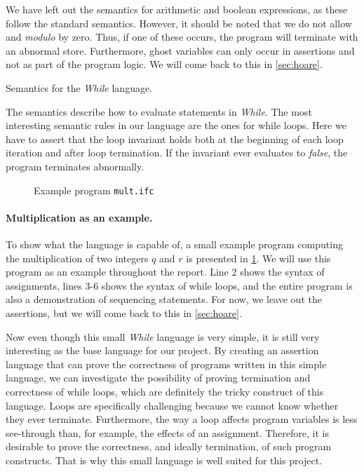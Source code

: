 We have left out the semantics for arithmetic and boolean expressions, as these follow the standard semantics.
However, it should be noted that we do not allow  and \textit{modulo} by zero.
Thus, if one of these occurs, the program will terminate with an abnormal store.
Furthermore, ghost variables can only occur in assertions and not as part of the program logic. We will come back to this in \cref{sec:hoare}.

\begin{table}[h!]
\centering

\caption{Semantics for the \textit{While} language.}
\label{table:semantic}
\end{table}

The semantics describe how to evaluate statements in \textit{While}. The most interesting semantic rules in our language are the ones for while loops.
Here we have to assert that the loop invariant holds both at the beginning of each loop iteration and after loop termination.
If the invariant ever evaluates to \textit{false}, the program terminates abnormally.

\begin{figure}[h]

\caption{Example program \texttt{mult.ifc}}
\label{figure:basicmult}
\end{figure}

\paragraph{Multiplication as an example.}
To show what the language is capable of, a small example program computing the multiplication of two integers $q$ and $r$ is presented in \cref{figure:basicmult}. 
We will use this program as an example throughout the report.
Line 2 shows the syntax of assignments, lines $3$-$6$ shows the syntax of while loops, and the entire program is also a demonstration of sequencing statements.
For now, we leave out the assertions, but we will come back to this in \cref{sec:hoare}.

Now even though this small \textit{While} language is very simple, it is still very interesting as the base language for our project.
By creating an assertion language that can prove the correctness of programs written in this simple language, we can investigate the possibility of proving termination and correctness of while loops, which are definitely the tricky construct of this language.
Loops are specifically challenging because we cannot know whether they ever terminate. Furthermore, the way a loop affects program variables is less see-through than, for example, the effects of an assignment.
Therefore, it is desirable to prove the correctness, and ideally termination, of such program constructs. That is why this small language is well suited for this project.
